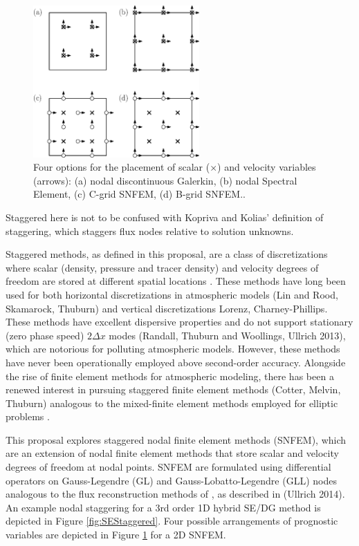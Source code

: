 \documentclass[11pt]{article}
\begin{document}
\begin{figure}
\begin{center}
\includegraphics[width=2.5in]{NodalArrangement}
\end{center}
\caption{Four options for the placement of scalar ($\times$) and velocity variables (arrows): (a) nodal discontinuous Galerkin, (b) nodal Spectral Element, (c) C-grid SNFEM, (d) B-grid SNFEM..} \label{fig:NodalArrangement}
\end{figure}

{\color{blue} Staggered here is not to be confused with Kopriva and Kolias' definition of staggering, which staggers flux nodes relative to solution unknowns.}

Staggered methods, as defined in this proposal, are a class of discretizations where scalar (density, pressure and tracer density) and velocity degrees of freedom are stored at different spatial locations \cite{AAVRL1977GCM}.  These methods have long been used for both horizontal discretizations in atmospheric models \citep{SJL2004MWR, WMPSJL2009NMSPF, SWCKJBDJetal2001, WCSJBKMGDLDFSHPTDR2012MWR} {\color{red}(Lin and Rood, Skamarock, Thuburn)} and vertical discretizations \cite{AASM1988JAS, JGCNAP1953JAS} {\color{red}Lorenz, Charney-Phillips}.  These methods have excellent dispersive properties and do not support stationary (zero phase speed) $2 \Delta x$ modes \cite{DAR1994MWR, JTTJW2005JCP} {\color{red}(Randall, Thuburn and Woollings, Ullrich 2013)}, which are notorious for polluting atmospheric models.  However, these methods have never been operationally employed above second-order accuracy.  Alongside the rise of finite element methods for atmospheric modeling, there has been a renewed interest in pursuing staggered finite element methods \citep{DBLG2009CS, CJCJS2012JCP} {\color{red}(Cotter, Melvin, Thuburn)} analogous to the mixed-finite element methods employed for elliptic problems \cite{PRJT1977MAFEM}.

This proposal explores staggered nodal finite element methods (SNFEM), which are an extension of nodal finite element methods that store scalar and velocity degrees of freedom at nodal points.  SNFEM are formulated using differential operators on Gauss-Legendre (GL) and Gauss-Lobatto-Legendre (GLL) nodes analogous to the flux reconstruction methods of \cite{HTH2007AIAA}, as described in {\color{red}(Ullrich 2014)}.  An example nodal staggering for a 3rd order 1D hybrid SE/DG method is depicted in Figure \ref{fig:SEStaggered}.  Four possible arrangements of prognostic variables are depicted in Figure \ref{fig:NodalArrangement} for a 2D SNFEM.  
\end{document}
